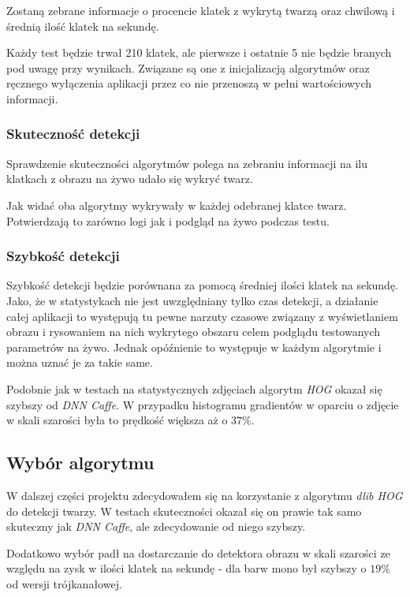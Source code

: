 Zostaną zebrane informacje o procencie klatek z wykrytą twarzą oraz chwilową i średnią ilość klatek na sekundę. 
\par
Każdy test będzie trwał 210 klatek, ale pierwsze i ostatnie 5 nie będzie branych pod uwagę przy wynikach. Związane są one z inicjalizacją algorytmów oraz ręcznego wyłączenia aplikacji przez co nie przenoszą w pełni wartościowych informacji.

\subsubsection{Skuteczność detekcji}

Sprawdzenie skuteczności algorytmów polega na zebraniu informacji na ilu klatkach z obrazu na żywo udało się wykryć twarz.



Jak widać oba algorytmy wykrywały w każdej odebranej klatce twarz. Potwierdzają to zarówno logi jak i podgląd na żywo podczas testu. 

\subsubsection{Szybkość detekcji}

Szybkość detekcji będzie porównana za pomocą średniej ilości klatek na sekundę. Jako, że w statystykach nie jest uwzględniany tylko czas detekcji, a działanie całej aplikacji to występują tu pewne narzuty czasowe związany z wyświetlaniem obrazu i rysowaniem na nich wykrytego obszaru celem podglądu testowanych parametrów na żywo. Jednak opóźnienie to występuje w każdym algorytmie i można uznać je za takie same.



Podobnie jak w testach na statystycznych zdjęciach algorytm \textit{HOG} okazał się szybszy od \textit{DNN Caffe}. W przypadku histogramu gradientów w oparciu o zdjęcie w skali szarości była to prędkość większa aż o $37 \%$.


\subsection{Wybór algorytmu}

W dalszej części projektu zdecydowałem się na korzystanie z algorytmu \textit{dlib HOG} do detekcji twarzy. W testach skuteczności okazał się on prawie tak samo skuteczny jak \textit{DNN Caffe}, ale zdecydowanie od niego szybszy. 
\par
Dodatkowo wybór padł na dostarczanie do detektora obrazu w skali szarości ze względu na zysk w ilości klatek na sekundę - dla barw mono był szybszy o $19 \%$ od wersji trójkanałowej.